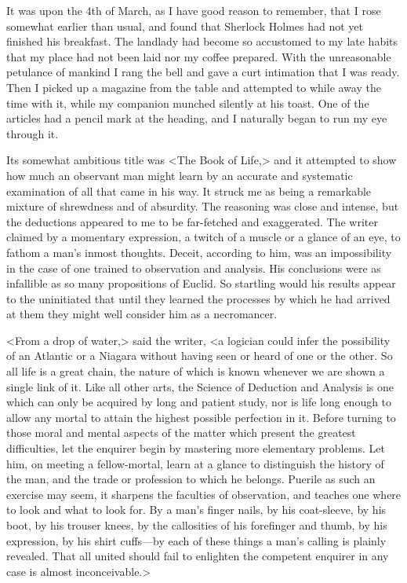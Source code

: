 It was upon the 4th of March, as I have good reason to remember, that I rose somewhat earlier than usual, and found that Sherlock Holmes had not yet finished his breakfast. The landlady had become so accustomed to my late habits that my place had not been laid nor my coffee prepared. With the unreasonable petulance of mankind I rang the bell and gave a curt intimation that I was ready. Then I picked up a magazine from the table and attempted to while away the time with it, while my companion munched silently at his toast. One of the articles had a pencil mark at the heading, and I naturally began to run my eye through it.

Its somewhat ambitious title was <The Book of Life,> and it attempted to show how much an observant man might learn by an accurate and systematic examination of all that came in his way. It struck me as being a remarkable mixture of shrewdness and of absurdity. The reasoning was close and intense, but the deductions appeared to me to be far-fetched and exaggerated. The writer claimed by a momentary expression, a twitch of a muscle or a glance of an eye, to fathom a man's inmost thoughts. Deceit, according to him, was an impossibility in the case of one trained to observation and analysis. His conclusions were as infallible as so many propositions of Euclid. So startling would his results appear to the uninitiated that until they learned the processes by which he had arrived at them they might well consider him as a necromancer.

<From a drop of water,> said the writer, <a logician could infer the possibility of an Atlantic or a Niagara without having seen or heard of one or the other. So all life is a great chain, the nature of which is known whenever we are shown a single link of it. Like all other arts, the Science of Deduction and Analysis is one which can only be acquired by long and patient study, nor is life long enough to allow any mortal to attain the highest possible perfection in it. Before turning to those moral and mental aspects of the matter which present the greatest difficulties, let the enquirer begin by mastering more elementary problems. Let him, on meeting a fellow-mortal, learn at a glance to distinguish the history of the man, and the trade or profession to which he belongs. Puerile as such an exercise may seem, it sharpens the faculties of observation, and teaches one where to look and what to look for. By a man's finger nails, by his coat-sleeve, by his boot, by his trouser knees, by the callosities of his forefinger and thumb, by his expression, by his shirt cuffs—by each of these things a man's calling is plainly revealed. That all united should fail to enlighten the competent enquirer in any case is almost inconceivable.>

